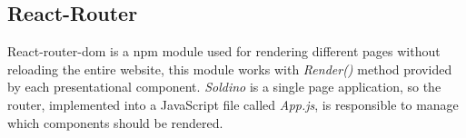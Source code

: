 \subsection{React-Router} 
React-router-dom is a npm module used for rendering different pages without reloading the entire website, this module works with \textit{Render()} method provided by each presentational component. \textit{Soldino} is a single page application, so the router, implemented into a JavaScript file called \textit{App.js}, is responsible to manage which components should be rendered.
